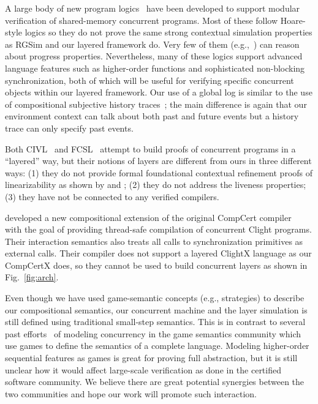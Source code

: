 A large body of new program
logics~\cite{ohearn:concur04,brookes:concur04,feng07:sagl,vafeiadis:marriage,LRG,verifast,gotsman13,Turon13popl,Turon13icfp,nanevski13,nanevski14,sergey15,sergey15pldi,pinto14,iris15,civl15,pinto16,xu16}
have been developed to support modular verification of shared-memory
concurrent programs. Most of these follow Hoare-style logics so they
do not prove the same strong contextual simulation properties as RGSim
and our layered framework do. Very few of them (e.g.,~\cite{pinto16})
can reason about progress properties. Nevertheless, many of these
logics support advanced language features such as higher-order functions
and sophisticated non-blocking synchronization, both of which will be
useful for verifying specific concurrent objects within our layered
framework. Our use of a global log is similar to the use of compositional
subjective history traces~\cite{sergey15}; the main difference is
again that our environment context can talk about both past and future
events but a history trace can only specify past events.

Both CIVL~\cite{civl15} and FCSL~\cite{sergey15pldi} attempt to build
proofs of concurrent programs in a ``layered'' way, but their notions
of layers are different from ours in three different ways: (1) they do
not provide formal foundational contextual refinement proofs of
linearizability as shown by \citet{filipovic10} and \citet{liang13};
(2) they do not address the liveness properties; (3) they have not be
connected to any verified compilers.

\citet{stewart15} developed a new compositional extension of the
original CompCert compiler~\cite{compcert} with the goal of providing
thread-safe compilation of concurrent Clight programs.  Their
interaction semantics also treats all calls to synchronization
primitives as external calls. Their compiler does not support a layered
ClightX language as our CompCertX does, so they cannot be used
to build concurrent layers as shown in Fig.~\ref{fig:arch}. 

 Even though we have used
game-semantic concepts (e.g., strategies) to describe our
compositional semantics, our concurrent machine and the layer simulation is still defined using
traditional small-step semantics.  This is in contrast to several past
efforts~\cite{ghica08,nishimura13,rideau11,abramsky99} of modeling
concurrency in the game semantics community which use games to
define the semantics of a complete language. Modeling higher-order
sequential features as games is great for proving full abstraction,
but it is still unclear how it would affect large-scale 
verification as done in the certified software community.  We 
believe there are great potential synergies between the two communities
and hope our work will promote such interaction.

